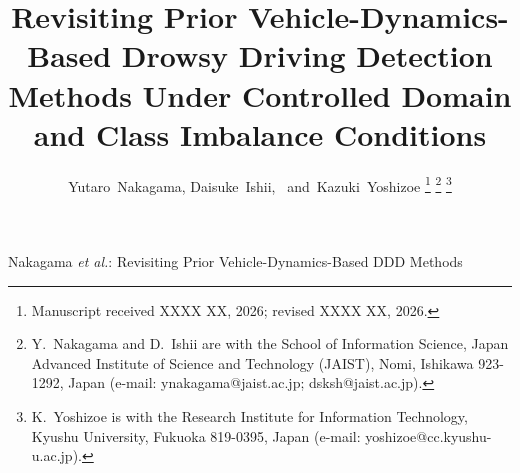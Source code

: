 \documentclass[lettersize,journal]{IEEEtran}
\begin{document}
\title{Revisiting Prior Vehicle-Dynamics-Based Drowsy Driving Detection Methods
       Under Controlled Domain and Class Imbalance Conditions}

\author{Yutaro~Nakagama,
Daisuke~Ishii,~ and~Kazuki~Yoshizoe
\thanks{Manuscript received XXXX XX, 2026; revised XXXX XX, 2026.}%
\thanks{Y.~Nakagama and D.~Ishii are with the School of Information Science, Japan Advanced Institute of Science and Technology (JAIST), Nomi, Ishikawa 923-1292, Japan (e-mail: ynakagama@jaist.ac.jp; dsksh@jaist.ac.jp).}%
\thanks{K.~Yoshizoe is with the Research Institute for Information Technology, Kyushu University, Fukuoka 819-0395, Japan (e-mail: yoshizoe@cc.kyushu-u.ac.jp).}}

%
{Nakagama \MakeLowercase{\textit{et al.}}: Revisiting Prior Vehicle-Dynamics-Based DDD Methods}

\maketitle
\end{document}
